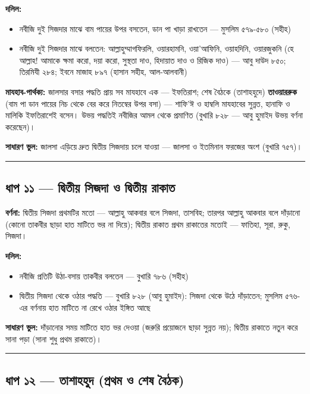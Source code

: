 \textbf{দলিল:}
\begin{itemize}
\item {}নবীজি দুই সিজদার মাঝে বাম পায়ের উপর বসতেন, ডান পা খাড়া রাখতেন — মুসলিম ৫৭৯-৫৮০ (সহীহ)
\item {}নবীজি দুই সিজদার মাঝে বলতেন: আল্লাহুম্মাগফিরলি, ওয়ারহামনি, ওয়া'আফিনি, ওয়াহদিনি, ওয়ারজুকনি (হে আল্লাহ! আমাকে ক্ষমা করো, দয়া করো, সুস্থতা দাও, হিদায়াত দাও ও রিজিক দাও) — আবু দাউদ ৮৫০; তিরমিযী ২৮৪; ইবনে মাজাহ ৮৯৭ (হাসান সহীহ, আল-আলবানী)
\end{itemize}
\textbf{মাযহাব-পার্থক্য:} জালসার বসার পদ্ধতি প্রায় সব মাযহাবে এক — ইফতিরাশ; শেষ বৈঠকে (তাশাহহুদে) \textbf{তাওয়াররুক} (বাম পা ডান পায়ের নিচ থেকে বের করে নিতম্বের উপর বসা) — শাফি'ঈ ও হাম্বলি মাযহাবের সুন্নত, হানাফি ও মালিকি ইফতিরাশেই বসেন। উভয় পদ্ধতিই নবীজির আমল থেকে প্রমাণিত (বুখারি ৮২৮ — আবু হুমাইদ উভয় বর্ণনা করেছেন)।

\textbf{সাধারণ ভুল:} জালসা এড়িয়ে দ্রুত দ্বিতীয় সিজদায় চলে যাওয়া — জালসা ও ইতমিনান ফরজের অংশ (বুখারি ৭৫৭)।

\medskip\hrule\medskip

\subsection*{ধাপ ১১ — দ্বিতীয় সিজদা ও দ্বিতীয় রাকাত}

\textbf{বর্ণনা:} দ্বিতীয় সিজদা প্রথমটির মতো — আল্লাহু আকবার বলে সিজদা, তাসবিহ; তারপর আল্লাহু আকবার বলে দাঁড়ানো (কোনো তাকবীর ছাড়া হাত মাটিতে ভর না দিয়ে); দ্বিতীয় রাকাত প্রথম রাকাতের মতোই — ফাতিহা, সূরা, রুকু, সিজদা।

\textbf{দলিল:}
\begin{itemize}
\item {}নবীজি প্রতিটি উঠা-বসায় তাকবীর বলতেন — বুখারি ৭৮৬ (সহীহ)
\item দ্বিতীয় সিজদা থেকে ওঠার পদ্ধতি — বুখারি ৮২৮ (আবু হুমাইদ): সিজদা থেকে উঠে দাঁড়াতেন; মুসলিম ৫৭৬-এর বর্ণনায় হাত মাটিতে না রেখে ওঠার ইঙ্গিত আছে
\end{itemize}
\textbf{সাধারণ ভুল:} দাঁড়ানোর সময় মাটিতে হাত ভর দেওয়া (জরুরি প্রয়োজনে ছাড়া সুন্নত নয়); দ্বিতীয় রাকাতে নতুন করে সানা পড়া (সানা শুধু প্রথম রাকাতে)।

\medskip\hrule\medskip

\subsection*{ধাপ ১২ — তাশাহহুদ (প্রথম ও শেষ বৈঠক)}

